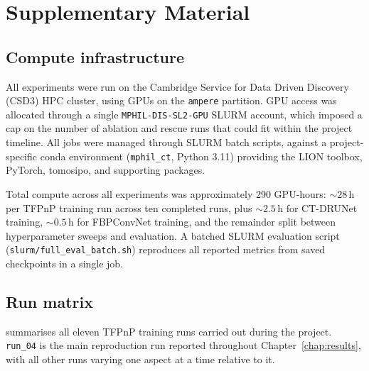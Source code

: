 \chapter{Supplementary Material}
\label{app:supplementary}

\section{Compute infrastructure}
\label{sec:compute-appendix}

All experiments were run on the Cambridge Service for Data Driven Discovery (CSD3) HPC cluster, using GPUs on the \texttt{ampere} partition. GPU access was allocated through a single \texttt{MPHIL-DIS-SL2-GPU} SLURM account, which imposed a cap on the number of ablation and rescue runs that could fit within the project timeline. All jobs were managed through SLURM batch scripts, against a project-specific conda environment (\texttt{mphil\_ct}, Python 3.11) providing the LION toolbox, PyTorch, tomosipo, and supporting packages.

Total compute across all experiments was approximately 290 GPU-hours: ${\sim}28$\,h per TFPnP training run across ten completed runs, plus ${\sim}2.5$\,h for CT-DRUNet training, ${\sim}0.5$\,h for FBPConvNet training, and the remainder split between hyperparameter sweeps and evaluation. A batched SLURM evaluation script (\texttt{slurm/full\_eval\_batch.sh}) reproduces all reported metrics from saved checkpoints in a single job.

\section{Run matrix}
\label{sec:run-matrix}

 summarises all eleven TFPnP training runs carried out during the project. \texttt{run\_04} is the main reproduction run reported throughout Chapter~\ref{chap:results}, with all other runs varying one aspect at a time relative to it.

